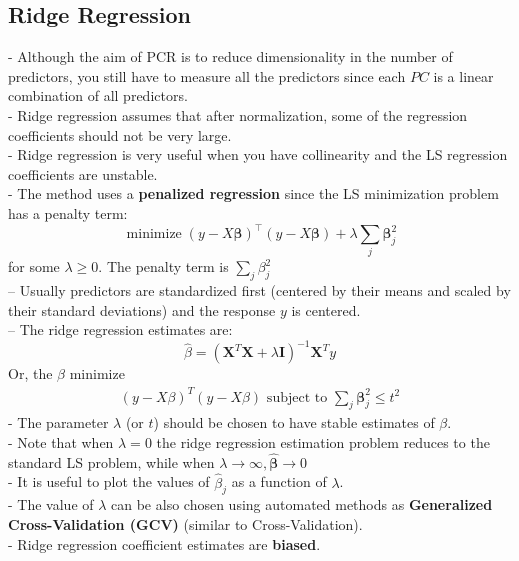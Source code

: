 \documentclass[11pt,a4paper]{article}
\begin{document}
\subsection{Ridge Regression}
- Although the aim of PCR is to reduce dimensionality in the number of predictors, you still have to measure all the predictors since each $P C$ is a linear combination of all predictors.\\
- Ridge regression assumes that after normalization, some of the regression coefficients should not be very large.\\
- Ridge regression is very useful when you have collinearity and the LS regression coefficients are unstable.\\
- The method uses a \textbf{penalized regression} since the LS minimization problem has a penalty term:
$$
\operatorname{minimize}(y-X \boldsymbol{\beta})^{\top}(y-X \boldsymbol{\beta})+\lambda \sum_{j} \boldsymbol{\beta}_{j}^{2}
$$
for some $\lambda \geq 0$. The penalty term is $\sum_{j} \beta_{j}^{2}$\\
– Usually predictors are standardized ﬁrst (centered by their means and scaled by their standard deviations) and the response $y$ is centered.\\
– The ridge regression estimates are:
$$\hat{\beta}=\left(\mathbf{X}^{T} \mathbf{X}+\lambda \mathbf{I}\right)^{-1} \mathbf{X}^{T} y$$
Or, the $\beta$ minimize
\begin{equation}
    \begin{aligned}
        (y-X\beta)^T(y-X\beta)\text{ subject to }\sum_{j} \boldsymbol{\beta}_{j}^{2}\leq t^2
    \end{aligned}
    \nonumber
\end{equation}
- The parameter $\lambda$ (or $t$) should be chosen to have stable estimates of $\beta$.\\

- Note that when $\lambda=0$ the ridge regression estimation problem reduces to the standard LS problem, while when $\lambda \rightarrow \infty, \hat{\boldsymbol{\beta}} \rightarrow 0$\\
- It is useful to plot the values of $\hat{\beta}_{j}$ as a function of $\lambda$.\\
- The value of $\lambda$ can be also chosen using automated methods as \textbf{Generalized Cross-Validation (GCV)} (similar to Cross-Validation).\\
- Ridge regression coefficient estimates are \textbf{biased}.
\end{document}
